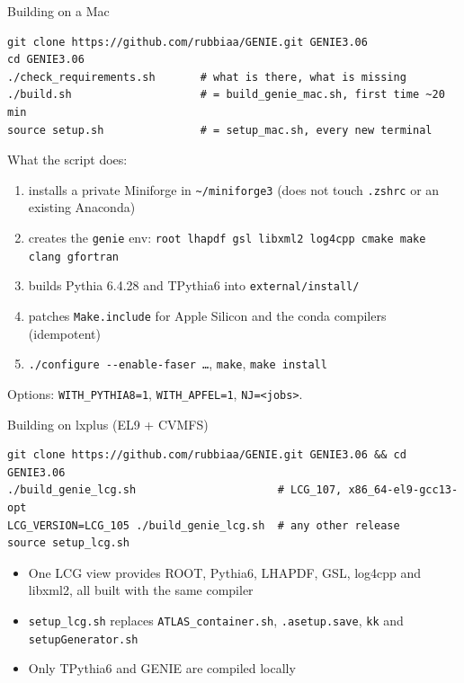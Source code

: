\documentclass[10pt,aspectratio=169]{beamer}
\newcommand{\code}[1]{\texttt{\small #1}}
\begin{document}
\begin{frame}[fragile]{Building on a Mac}
\begin{lstlisting}
git clone https://github.com/rubbiaa/GENIE.git GENIE3.06
cd GENIE3.06
./check_requirements.sh       # what is there, what is missing
./build.sh                    # = build_genie_mac.sh, first time ~20 min
source setup.sh               # = setup_mac.sh, every new terminal
\end{lstlisting}
  \vspace{0.5em}
  What the script does:
  \begin{enumerate}\small
    \item installs a private Miniforge in \code{\textasciitilde/miniforge3} (does not touch \code{.zshrc} or an existing Anaconda)
    \item creates the \code{genie} env: \code{root lhapdf gsl libxml2 log4cpp cmake make clang gfortran}
    \item builds Pythia 6.4.28 and TPythia6 into \code{external/install/}
    \item patches \code{Make.include} for Apple Silicon and the conda compilers (idempotent)
    \item \code{./configure -{}-enable-faser \dots}, \code{make}, \code{make install}
  \end{enumerate}
  \small Options: \code{WITH\_PYTHIA8=1}, \code{WITH\_APFEL=1}, \code{NJ=<jobs>}.
\end{frame}

\begin{frame}[fragile]{Building on lxplus (EL9 + CVMFS)}
\begin{lstlisting}
git clone https://github.com/rubbiaa/GENIE.git GENIE3.06 && cd GENIE3.06
./build_genie_lcg.sh                      # LCG_107, x86_64-el9-gcc13-opt
LCG_VERSION=LCG_105 ./build_genie_lcg.sh  # any other release
source setup_lcg.sh
\end{lstlisting}
  \vspace{0.5em}
  \begin{itemize}\small
    \item One LCG view provides ROOT, Pythia6, LHAPDF, GSL, log4cpp and libxml2,
          all built with the same compiler
    \item \code{setup\_lcg.sh} replaces \code{ATLAS\_container.sh}, \code{.asetup.save},
          \code{kk} and \code{setupGenerator.sh}
    \item Only TPythia6 and GENIE are compiled locally
  \end{itemize}
\end{frame}
\end{document}

